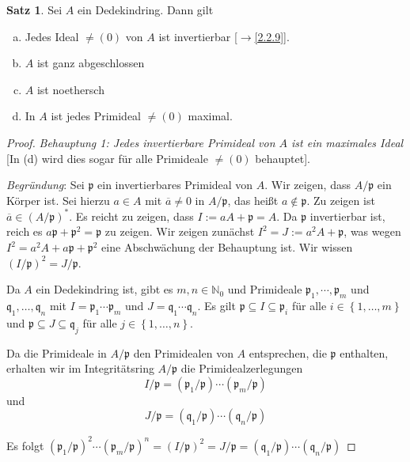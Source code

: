 \documentclass[
twoside=semi,
fontsize=12,
DIV=12, 
cleardoublepage=current,
leqno,
headings=optiontoheadandtoc, 
toc=idx
]{scrbook}
\newcommand{\N}{\mathbb{N}}
\newcommand{\set}[1]{\left\{ #1 \right\}}
\theoremstyle{definition}
\newtheorem{satz}[definition]{Satz}
\begin{document}
 	\begin{satz}\label{2.2.12}
 		Sei $A$ ein Dedekindring. Dann gilt 
 		\begin{enumerate}[(a)]
 			\item Jedes Ideal $\neq (0)$ von $A$ ist invertierbar [$\to$\ref{2.2.9}].
 			\item $A$ ist ganz abgeschlossen
 			\item $A$ ist noethersch
 			\item In $A$ ist jedes Primideal $\neq (0)$ maximal.
 		\end{enumerate}
 	
 		\begin{proof}
 			\emph{Behauptung 1: Jedes invertierbare Primideal von $A$ ist ein maximales Ideal} [In (d) wird dies sogar f\"ur alle Primideale $\neq (0)$ behauptet].
 			
 			\emph{Begr\"undung}: Sei $\mathfrak{p}$ ein invertierbares Primideal von $A$. Wir zeigen, dass $A/\mathfrak{p}$ ein K\"orper ist. Sei hierzu $a \in A$ mit $\overline{a} \neq 0$ in $A/\mathfrak{p}$, das hei\ss t $a \notin \mathfrak{p}$. Zu zeigen ist $\overline{a} \in (A/\mathfrak{p})^*$. Es reicht zu zeigen, dass $I:= aA + \mathfrak{p} = A$. Da $\mathfrak{p}$ invertierbar ist, reich es $a\mathfrak{p} + \mathfrak{p}^2 = \mathfrak{p}$ zu zeigen. Wir zeigen zun\"achst $I^2 = J:= a^2A + \mathfrak{p}$, was wegen $I^2 = a^2A + a\mathfrak{p} + \mathfrak{p}^2$ eine Abschw\"achung der Behauptung ist. Wir wissen $(I/\mathfrak{p})^2 = J/\mathfrak{p}$.
 			
 			Da $A$ ein Dedekindring ist, gibt es $m,n \in \N_0$ und Primideale $\mathfrak{p}_1,\cdots, \mathfrak{p}_m$ und $\mathfrak{q}_1,\dots, \mathfrak{q}_n$ mit $I = \mathfrak{p}_1 \cdots \mathfrak{p}_m$ und $J = \mathfrak{q}_1 \cdots \mathfrak{q}_n$. Es gilt $\mathfrak{p} \subseteq I \subseteq \mathfrak{p}_i$ f\"ur alle $i \in \set{1,\dots, m}$ und $\mathfrak{p} \subseteq J \subseteq \mathfrak{q}_j$ f\"ur alle $j \in\set{1,\dots,n}$. 
 			
 			Da die Primideale in $A/\mathfrak{p}$ den Primidealen von $A$ entsprechen, die $\mathfrak{p}$ enthalten, erhalten wir im Integrit\"atsring $A/\mathfrak{p}$ die Primidealzerlegungen
 				\[I/\mathfrak{p} = (\mathfrak{p}_1/\mathfrak{p}) \cdots (\mathfrak{p}_m/\mathfrak{p})\]
 			und 
 				\[J/\mathfrak{p} = (\mathfrak{q}_1/\mathfrak{p}) \cdots (\mathfrak{q}_n/\mathfrak{p})\]
 			
 			Es folgt $(\mathfrak{p}_1/\mathfrak{p})^2 \cdots (\mathfrak{p}_m/\mathfrak{p})^n = (I/\mathfrak{p})^2 = J/\mathfrak{p} = (\mathfrak{q}_1/\mathfrak{p})\cdots (\mathfrak{q}_n/\mathfrak{p})$
 			

\end{proof}
\end{satz}
\end{document}
